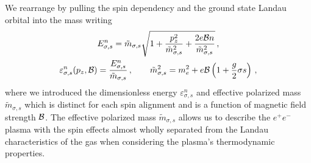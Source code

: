 We rearrange  by pulling the spin dependency and the ground state Landau orbital into the mass writing
\begin{gather}
 \label{effmass:1}
 E^{n}_{\sigma,s}={\tilde m}_{\sigma,s}\sqrt{1+\frac{p_{z}^{2}}{{\tilde m}_{\sigma,s}^{2}}+\frac{2e{\cal B}n}{{\tilde m}_{\sigma,s}^{2}}}\,,\\
 \label{effmass:2}
 \varepsilon_{\sigma,s}^{n}(p_{z},{\cal B})=\frac{E_{\sigma,s}^{n}}{{\tilde m}_{\sigma,s}}\,,\qquad{\tilde m}_{\sigma,s}^{2}=m_{e}^{2}+e{\cal B}\left(1+\frac{g}{2}\sigma s\right)\,,
\end{gather}
where we introduced the dimensionless energy $\varepsilon^{n}_{\sigma,s}$ and effective polarized mass ${\tilde m}_{\sigma,s}$ which is distinct for each spin alignment and is a function of magnetic field strength ${\cal B}$. The effective polarized mass ${\tilde m}_{\sigma,s}$ allows us to describe the $e^{+}e^{-}$ plasma with the spin effects almost wholly separated from the Landau characteristics of the gas when considering the plasma's thermodynamic properties.

